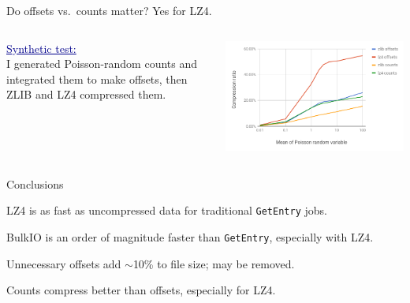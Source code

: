 \documentclass[aspectratio=169]{beamer}
\begin{document}
\begin{frame}{Do offsets vs.\ counts matter? Yes for LZ4.}
\vspace{0.5 cm}
\begin{columns}
\textcolor{darkblue}{\underline{Synthetic test:}} \\ \vspace{0.1 cm} I generated Poisson-random counts and integrated them to make offsets, then ZLIB and LZ4 compressed them.

\includegraphics[width=\linewidth]{offsets-vs-counts.png}
\end{columns}
\end{frame}

\begin{frame}{Conclusions}
\vspace{0.5 cm}
\begin{center}
\begin{minipage}{0.88\linewidth}
LZ4 is as fast as uncompressed data for traditional {\tt GetEntry} jobs.

\vspace{0.5 cm}
BulkIO is an order of magnitude faster than {\tt GetEntry}, especially with LZ4.

\vspace{0.5 cm}
Unnecessary offsets add $\sim$10\% to file size; may be removed.

\vspace{0.5 cm}
Counts compress better than offsets, especially for LZ4.
\end{minipage}
\end{center}
\end{frame}
\end{document}
